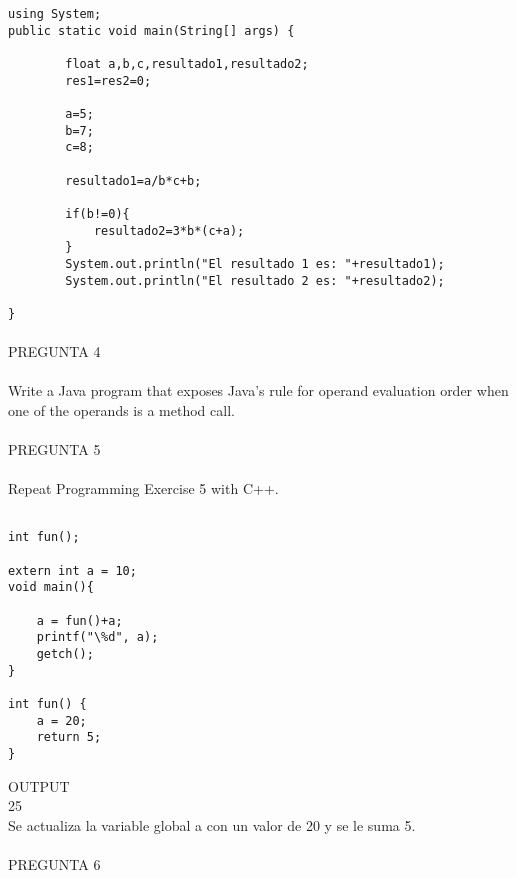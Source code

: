 \documentclass[../main.tex]{subfiles}
\begin{document}
\begin{lstlisting}[frame=single] 
using System;
public static void main(String[] args) {
        
        float a,b,c,resultado1,resultado2;
        res1=res2=0;
        
        a=5;
        b=7;
        c=8;
       
        resultado1=a/b*c+b;
       
        if(b!=0){
            resultado2=3*b*(c+a);
        }
        System.out.println("El resultado 1 es: "+resultado1);
        System.out.println("El resultado 2 es: "+resultado2);
        
}

\end{lstlisting}





\paragraph{ }PREGUNTA 4
\paragraph{ }
Write a Java program that exposes Java’s rule for operand evaluation order when one of the operands is a method call. 


\paragraph{ }PREGUNTA 5
\paragraph{ }
Repeat Programming Exercise 5 with C++. 
\begin{lstlisting}[frame=single] 

int fun();

extern int a = 10;
void main(){
	
	a = fun()+a; 
	printf("\%d", a);
	getch();
}

int fun() {
	a = 20;
	return 5;
}
\end{lstlisting}
OUTPUT\\25\\
Se actualiza la variable global a con un valor de 20 y se le suma 5.



\paragraph{ }PREGUNTA 6
\end{document}
